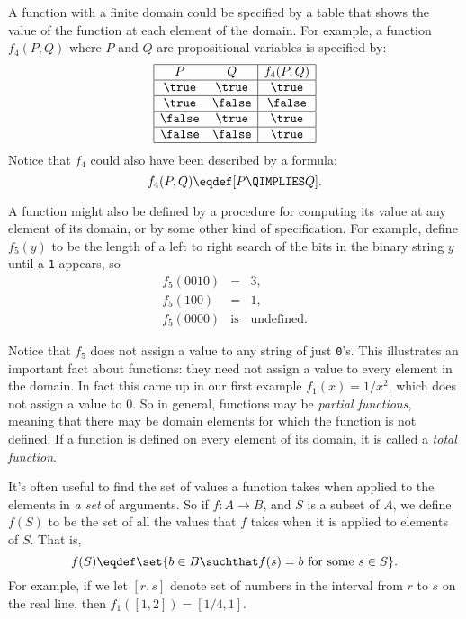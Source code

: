A function with a finite domain could be specified by a table that shows
the value of the function at each element of the domain.  For example, a function
$f_4(P,Q)$ where $P$ and $Q$ are propositional variables is specified by:
\[\begin{array}{|cc|c|}
\hline
P & Q & f_4(P,Q)\\
\hline \true & \true & \true\\
\hline \true & \false & \false\\
\hline \false & \true & \true\\
\hline \false & \false & \true\\
\hline
\end{array}\]
Notice that $f_4$ could also have been described by a formula:
\[
f_4(P,Q)  \eqdef [P \QIMPLIES Q].
\]

A function might also be defined by a procedure for computing its value at
any element of its domain, or by some other kind of specification.  For
example, define $f_5(y)$ to be the length of a left to right search of the
bits in the binary string $y$ until a \texttt{1} appears, so
\begin{eqnarray*}
f_5(0010) & = &  3,\\
f_5(100)  & = & 1,\\
f_5(0000) & \text{is} & \text{undefined}.
\end{eqnarray*}

Notice that $f_5$ does not assign a value to any string of just \texttt{0}'s.
This illustrates an important fact about functions: they need not assign a
value to every element in the domain.  In fact this came up in our first
example $f_1(x)=1/x^2$, which does not assign a value to $0$.  So in
general, functions may be \emph{partial%
functions}, meaning that there may be domain
elements for which the function is not defined.  If a function is defined
on every element of its domain, it is called a \emph{total%
function}.

It's often useful to find the set of values a function takes when applied
to the elements in \emph{a set} of arguments.  So if $f:A \to B$, and $S$
is a subset of $A$, we define $f(S)$ to be the set of all the values that
$f$ takes when it is applied to elements of $S$.  That is,
\[
f(S) \eqdef \set{b \in B \suchthat f(s) = b \text{ for some } s
  \in S}.
\]
For example, if we let $[r,s]$ denote set of numbers in the
interval from $r$ to $s$ on the real line, then $f_1([1,2]) =
[1/4,1]$.

